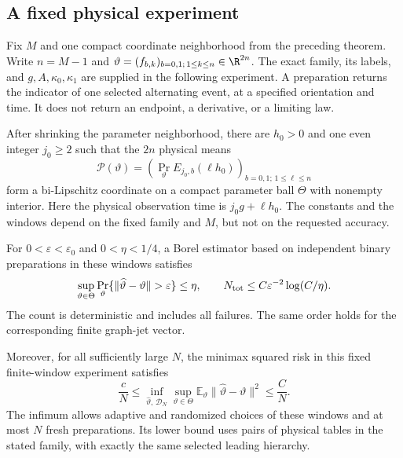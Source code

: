 \subsection{A fixed physical experiment}
Fix $M$ and one compact coordinate neighborhood from the preceding
theorem. Write $n=M-1$ and
$\vartheta=(f_{b,k})_{b=0,1;\,1\le k\le n}\in\R^{2n}$.
The exact family, its labels, and $g,A,\kappa_0,\kappa_1$ are supplied
in the following experiment. A preparation returns the indicator of
one selected alternating event, at a specified orientation and time.
It does not return an endpoint, a derivative, or a limiting law.

\begin{theorem}
\label{thm:v12-finite-observation}
After shrinking the parameter neighborhood, there are $h_0>0$ and
one even integer $j_0\ge2$ such that the $2n$ physical means
\begin{equation}\label{eq:v12-window-map}
 \mathcal P(\vartheta)=
 \left(\Pr_{\vartheta}
       E_{j_0,b}(\ell h_0)\right)_{b=0,1;\,1\le\ell\le n}
\end{equation}
form a bi-Lipschitz coordinate on a compact parameter ball $\Theta$
with nonempty interior. Here the physical observation time is
$j_0g+\ell h_0$. The constants and the windows depend on the fixed
family and $M$, but not on the requested accuracy.

For $0<\varepsilon<\varepsilon_0$ and $0<\eta<1/4$, a Borel
estimator based on independent binary preparations in these windows
satisfies
\[
 \sup_{\vartheta\in\Theta}
 \Pr_{\vartheta}\{\|\widehat\vartheta-\vartheta\|>
                 \varepsilon\}\le\eta,
 \qquad N_{\rm tot}\le C\varepsilon^{-2}\log(C/\eta).
\]
The count is deterministic and includes all failures. The same order
holds for the corresponding finite graph-jet vector.

Moreover, for all sufficiently large $N$, the minimax squared risk
in this fixed finite-window experiment satisfies
\begin{equation}\label{eq:v12-physical-risk}
 \frac{c}{N}\le
 \inf_{\widehat\vartheta,\,\mathcal D_N}
       \sup_{\vartheta\in\Theta}
          \mathbb E_{\vartheta}
                    \|\widehat\vartheta-\vartheta\|^2
       \le\frac{C}{N}.
\end{equation}
The infimum allows adaptive and randomized choices of these windows
and at most $N$ fresh preparations. Its lower bound uses pairs of
physical tables in the stated family, with exactly the same selected
leading hierarchy.
\end{theorem}
